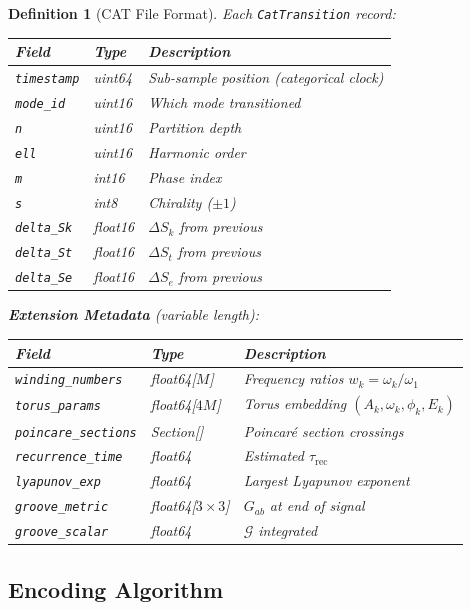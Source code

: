 \documentclass[twocolumn,10pt]{article}
\newtheorem{definition}[theorem]{Definition}
\theoremstyle{remark}
\newcommand{\Sk}{S_k}
\newcommand{\St}{S_t}
\newcommand{\Se}{S_e}
\newcommand{\calG}{\mathcal{G}}
\begin{document}
\begin{definition}[CAT File Format]
Each \texttt{CatTransition} record:
\begin{center}
\begin{tabular}{llp{4.5cm}}
\toprule
Field & Type & Description \\
\midrule
\texttt{timestamp} & uint64 & Sub-sample position (categorical clock) \\
\texttt{mode\_id} & uint16 & Which mode transitioned \\
\texttt{n} & uint16 & Partition depth \\
\texttt{ell} & uint16 & Harmonic order \\
\texttt{m} & int16 & Phase index \\
\texttt{s} & int8 & Chirality ($\pm 1$) \\
\texttt{delta\_Sk} & float16 & $\Delta\Sk$ from previous \\
\texttt{delta\_St} & float16 & $\Delta\St$ from previous \\
\texttt{delta\_Se} & float16 & $\Delta\Se$ from previous \\
\bottomrule
\end{tabular}
\end{center}

\textbf{Extension Metadata} (variable length):
\begin{center}
\begin{tabular}{llp{4.5cm}}
\toprule
Field & Type & Description \\
\midrule
\texttt{winding\_numbers} & float64[$M$] & Frequency ratios $w_k = \omega_k/\omega_1$ \\
\texttt{torus\_params} & float64[$4M$] & Torus embedding $(A_k, \omega_k, \phi_k, E_k)$ \\
\texttt{poincare\_sections} & Section[] & Poincar\'{e} section crossings \\
\texttt{recurrence\_time} & float64 & Estimated $\tau_{\mathrm{rec}}$ \\
\texttt{lyapunov\_exp} & float64 & Largest Lyapunov exponent \\
\texttt{groove\_metric} & float64[$3 \times 3$] & $G_{ab}$ at end of signal \\
\texttt{groove\_scalar} & float64 & $\calG$ integrated \\
\bottomrule
\end{tabular}
\end{center}
\end{definition}

\subsection{Encoding Algorithm}
\end{document}
